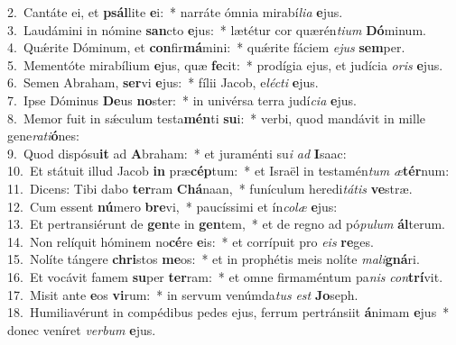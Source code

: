 {2.~}Cantáte ei, et \textbf{psál}lite \textbf{e}i:~* narráte ómnia mirabí\textit{li}\textit{a} \textbf{e}jus.\\
{3.~}Laudámini in nómine \textbf{san}cto \textbf{e}jus:~* lætétur cor quærén\textit{ti}\textit{um} \textbf{Dó}minum.\\
{4.~}Quǽrite Dóminum, et \textbf{con}fir\textbf{má}mini:~* quǽrite fáciem \textit{e}\textit{jus} \textbf{sem}per.\\
{5.~}Mementóte mirabílium \textbf{e}jus, quæ \textbf{fe}cit:~* prodígia ejus, et judícia \textit{o}\textit{ris} \textbf{e}jus.\\
{6.~}Semen Abraham, \textbf{ser}vi \textbf{e}jus:~* fílii Jacob, e\textit{lé}\textit{cti} \textbf{e}jus.\\
{7.~}Ipse Dóminus \textbf{De}us \textbf{no}ster:~* in univérsa terra judí\textit{ci}\textit{a} \textbf{e}jus.\\
{8.~}Memor fuit in sǽculum testa\textbf{mén}ti \textbf{su}i:~* verbi, quod mandávit in mille gene\textit{ra}\textit{ti}\textbf{ó}nes:\\
{9.~}Quod dispósu\textbf{it} ad \textbf{A}braham:~* et juraménti su\textit{i} \textit{ad} \textbf{I}saac:\\
{10.~}Et státuit illud Jacob \textbf{in} præ\textbf{cép}tum:~* et Israël in testamén\textit{tum} \textit{æ}\textbf{tér}num:\\
{11.~}Dicens: Tibi dabo \textbf{ter}ram \textbf{Chá}naan,~* funículum heredi\textit{tá}\textit{tis} \textbf{ve}stræ.\\
{12.~}Cum essent \textbf{nú}mero \textbf{bre}vi,~* paucíssimi et ín\textit{co}\textit{læ} \textbf{e}jus:\\
{13.~}Et pertransiérunt de \textbf{gen}te in \textbf{gen}tem,~* et de regno ad pó\textit{pu}\textit{lum} \textbf{ál}terum.\\
{14.~}Non relíquit hóminem no\textbf{cé}re \textbf{e}is:~* et corrípuit pro \textit{e}\textit{is} \textbf{re}ges.\\
{15.~}Nolíte tángere \textbf{chri}stos \textbf{me}os:~* et in prophétis meis nolíte \textit{ma}\textit{li}\textbf{gná}ri.\\
{16.~}Et vocávit famem \textbf{su}per \textbf{ter}ram:~* et omne firmaméntum pa\textit{nis} \textit{con}\textbf{trí}vit.\\
{17.~}Misit ante \textbf{e}os \textbf{vi}rum:~* in servum venúmda\textit{tus} \textit{est} \textbf{Jo}seph.\\
{18.~}Humiliavérunt in compédibus pedes ejus, ferrum pertránsiit \textbf{á}nimam \textbf{e}jus~* donec veníret \textit{ver}\textit{bum} \textbf{e}jus.\\
